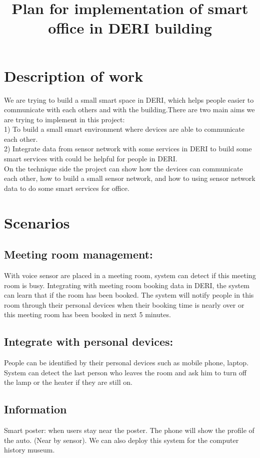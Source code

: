 \documentclass[a4paper]{llncs}
\begin{document}
\title{Plan for implementation of smart office in DERI building}
\maketitle
\section{Description of work}
We are trying to build a small smart space in DERI, which helps people easier to communicate with each others and with the building.There are two main aims we are trying to implement in this project:\\
1) To build a small smart environment where devices are able to communicate each other.\\
2) Integrate data from sensor network with some services in DERI to build some smart services with could be helpful for people in DERI.\\
On the technique side the project can show how the devices can communicate each other, how to build a small sensor network, and how to using sensor network data to do some smart services for office.
\section{Scenarios}
\subsection{Meeting room management: }
 With voice sensor are placed in a meeting room, system can detect if this meeting room is busy. Integrating with meeting room booking data in DERI, the system can learn that if the room has been booked. The system will notify people in this room through their personal devices when their booking time is nearly over or this meeting room has been booked in next 5 minutes.
\subsection{Integrate with personal devices: }
People can be identified by their personal devices such as mobile phone, laptop.  System can detect the last person who leaves the room and ask him to turn off the lamp or the heater if they are still on.
\subsection{Information}
Smart poster: when users stay near the poster. The phone will show the profile of the auto. (Near by sensor). We can also deploy this system for the computer history museum.
\end{document}
